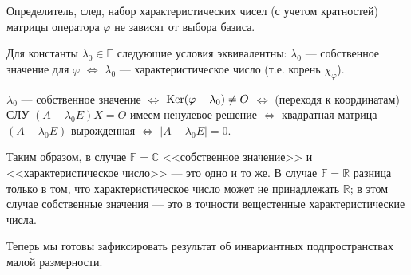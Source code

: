 \begin{sled}
Определитель, след, набор характеристических чисел (с учетом кратностей) 
матрицы оператора  $\varphi$ не зависят от выбора базиса.
\end{sled}


\otstup

\begin{theor}\label{t8_5_1}
Для константы $\lambda_0 \in \mathbb{F}$ следующие условия эквивалентны:
$\lambda_0$ --- собственное значение для $\varphi$
$\Leftrightarrow$ $\lambda_0$ --- характеристическое число (т.е. корень $\chi_{\varphi}$).
\end{theor}
\dok $\lambda_0$ --- собственное значение $\Leftrightarrow$
$\mathop{\rm Ker}\nolimits (\varphi - \lambda_0) \neq O$ $\Leftrightarrow$ (переходя к координатам)
СЛУ $(A - \lambda_0 E)X=O$ имеем ненулевое решение $\Leftrightarrow$
квадратная матрица $(A - \lambda_0 E)$ вырожденная 
$\Leftrightarrow$ $|A - \lambda_0 E|=0$.
\edok

\otstup

Таким образом, в случае $\mathbb{F} = \mathbb{C}$ <<собственное значение>>
и <<характеристическое число>> --- это одно и то же. 
В случае $\mathbb{F} = \mathbb{R}$ разница только в том, что характеристическое число может не принадлежать
$\mathbb{R}$; в этом случае собственные значения --- это в точности
вещестенные характеристические числа.

\otstup

Теперь мы готовы зафиксировать результат об инвариантных подпространствах малой размерности.

